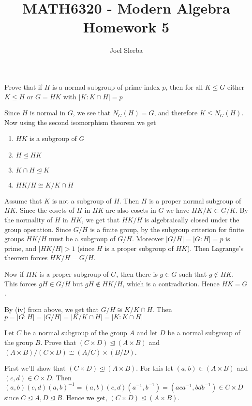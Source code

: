 \documentclass[12pt]{exam}
\theoremstyle{plain} %
\theoremstyle{definition} %
\theoremstyle{remark} %
\begin{document}
\title{MATH6320 - Modern Algebra  \\ Homework 5}

\author{
  Joel Sleeba \\
}

\maketitle
\printanswers
\unframedsolutions

\begin{questions}

  \question
  Prove that if $H$ is a normal subgroup of prime index $p$, then for all $K \leqslant G$ either $K \leqslant H$ or $G = HK$ with $|K:K\cap H| = p$
  \begin{solution}
    Since $H$ is normal in $G$, we see that $N_G(H) = G$, and therefore $K \leqslant N_G(H)$. Now using the second isomorphism theorem we get
    \begin{enumerate}[label=(\roman*)]
      \item $HK$ is a subgroup of $G$
      \item $H \trianglelefteq HK$
      \item $K \cap H \trianglelefteq K$
      \item $HK/H \cong K/K \cap H$
    \end{enumerate}
    Assume that $K$ is not a subgroup of $H$. Then $H$ is a proper normal subgroup of $HK$. Since the cosets of $H$ in $HK$ are also cosets in $G$ we have $HK/K \subset G/K$. By the normality of $H$ in $HK$, we get that $HK/H$ is algebraically closed under the group operation. Since $G/H$ is a finite group, by the subgroup criterion for finite groups $HK/H$ must be a subgroup of $G/H$. Moreover $|G/H| = |G:H| = p$ is prime, and $|HK/H|>1$ (since $H$ is a proper subgroup of $HK$). Then Lagrange's theorem forces $HK/H = G/H$.

    Now if $HK$ is a proper subgroup of $G$, then there is $g \in G$ such that $g \notin HK$. This forces $gH \in G/H$ but $gH \notin HK/H$, which is a contradiction. Hence $HK = G$.

    By (iv) from above, we get that $G/H \cong K/K\cap H$. Then $p = |G:H| = |G/H| = |K/K\cap H| = |K:K\cap H|$
  \end{solution}

  \question
  Let $C$ be a normal subgroup of the group $A$ and let $D$ be a normal subgroup of the group $B$. Prove that $(C \times D) \trianglelefteq (A \times B)$ and $(A \times B)/(C \times D) \cong (A/C)\times(B/D)$.
  \begin{solution}
    First we'll show that $(C \times D) \trianglelefteq (A \times B)$. For this let $(a, b) \in (A \times B)$ and $(c, d) \in C \times D$. Then $(a, b)(c, d)(a, b)^{-1} = (a, b)(c, d)(a^{-1}, b^{-1}) = (aca^{-1}, bdb^{-1}) \in C \times D$ since $C \trianglelefteq A, D \trianglelefteq B$. Hence we get, $(C \times D) \trianglelefteq (A \times B)$.


\end{solution}
\end{questions}
\end{document}
